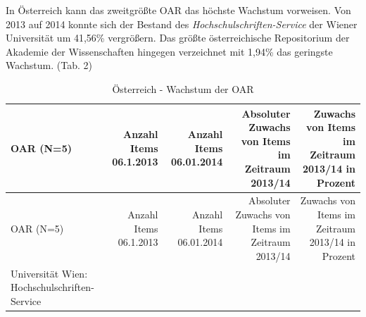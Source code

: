 \documentclass[a4paper,
fontsize=11pt,
oneside,
numbers=noperiodatend,
parskip=half-,
bibliography=totoc,
final
]{scrartcl}
\begin{document}
In Österreich kann das zweitgrößte OAR das höchste Wachstum vorweisen.
Von 2013 auf 2014 konnte sich der Bestand des
\emph{Hochschulschriften-Service} der Wiener Universität um 41,56\%
vergrößern. Das größte österreichische Repositorium der Akademie der
Wissenschaften hingegen verzeichnet mit 1,94\% das geringste Wachstum.
(Tab. 2)

\begin{longtable}[c]{@{}lrrrr@{}}
\caption{Österreich - Wachstum der OAR}\tabularnewline
\toprule
\begin{minipage}[b]{0.31\columnwidth}\raggedright\strut
OAR (N=5)
\strut\end{minipage} &
\begin{minipage}[b]{0.14\columnwidth}\raggedleft\strut
Anzahl Items 06.1.2013
\strut\end{minipage} &
\begin{minipage}[b]{0.15\columnwidth}\raggedleft\strut
Anzahl Items 06.01.2014
\strut\end{minipage} &
\begin{minipage}[b]{0.14\columnwidth}\raggedleft\strut
Absoluter Zuwachs von Items im Zeitraum 2013/14
\strut\end{minipage} &
\begin{minipage}[b]{0.14\columnwidth}\raggedleft\strut
Zuwachs von Items im Zeitraum 2013/14 in Prozent
\strut\end{minipage}\tabularnewline
\midrule
\endfirsthead
\toprule
\begin{minipage}[b]{0.31\columnwidth}\raggedright\strut
OAR (N=5)
\strut\end{minipage} &
\begin{minipage}[b]{0.14\columnwidth}\raggedleft\strut
Anzahl Items 06.1.2013
\strut\end{minipage} &
\begin{minipage}[b]{0.15\columnwidth}\raggedleft\strut
Anzahl Items 06.01.2014
\strut\end{minipage} &
\begin{minipage}[b]{0.14\columnwidth}\raggedleft\strut
Absoluter Zuwachs von Items im Zeitraum 2013/14
\strut\end{minipage} &
\begin{minipage}[b]{0.14\columnwidth}\raggedleft\strut
Zuwachs von Items im Zeitraum 2013/14 in Prozent
\strut\end{minipage}\tabularnewline
\midrule
\endhead
\begin{minipage}[t]{0.31\columnwidth}\raggedright\strut
Universität Wien: Hochschulschriften-Service

\end{minipage}
\end{longtable}
\end{document}
